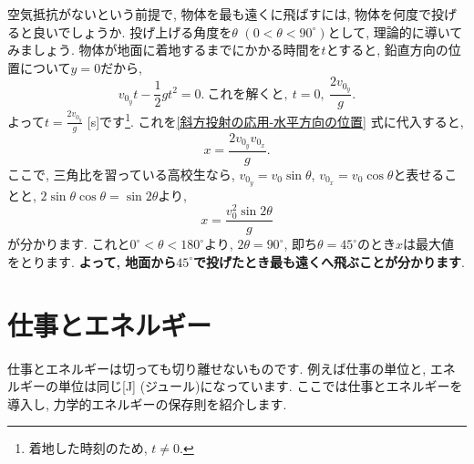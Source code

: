 \documentclass[11pt,dvipdfmx]{jsarticle}
\numberwithin{equation}{section} %
\begin{document}
空気抵抗がないという前提で, 物体を最も遠くに飛ばすには, 物体を何度で投げると良いでしょうか. 投げ上げる角度を$\theta$ $(0 < \theta < 90^\circ)$として, 理論的に導いてみましょう. 物体が地面に着地するまでにかかる時間を$t$とすると, 鉛直方向の位置について$y = 0$だから, 
\begin{equation}
    v_{0_{y}}t - \frac{1}{2}gt^2 = 0.\ これを解くと,\ t = 0,\ \frac{2v_{0_{y}}}{g}.
\end{equation} 
よって$t = \frac{2v_{0_{y}}}{g}$ [s]です\footnote{着地した時刻のため, $t\neq 0$.}. これを\eqref{斜方投射の応用-水平方向の位置} 式に代入すると, 
\begin{equation}
    x = \frac{2v_{0_{y}}v_{0_{x}}}{g}.
\end{equation}
ここで, 三角比を習っている高校生なら, $v_{0_{y}} = v_{0}\sin\theta$, $v_{0_{x}} = v_{0}\cos\theta$と表せることと, $2\sin\theta\cos\theta = \sin{2\theta}$より, 
\begin{equation}
    x = \frac{v_{0}^2\sin{2\theta}}{g}
\end{equation}
が分かります. これと$0^{\circ} < \theta < 180^\circ$より, $2\theta = 90^\circ$, 即ち$\theta = 45^{\circ}$のとき$x$は最大値をとります. \textbf{よって, 地面から$45^{\circ}$で投げたとき最も遠くへ飛ぶことが分かります}.

\section{仕事とエネルギー}
仕事とエネルギーは切っても切り離せないものです. 例えば仕事の単位と, エネルギーの単位は同じ[J] (ジュール)になっています. ここでは仕事とエネルギーを導入し, 力学的エネルギーの保存則を紹介します. 
\end{document}
